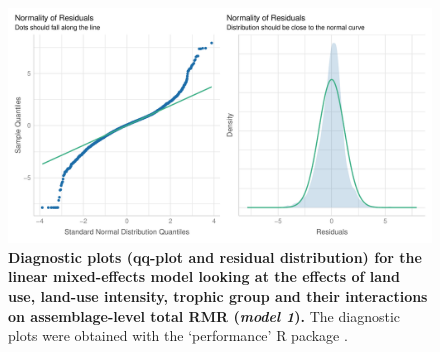 \begin{figure}[h!]
\centering
\includegraphics[scale=0.75]{Supporting/Chapter5/Figures/Diagnostics_tRMR}
\caption[Diagnostic plots for the linear mixed-effects model looking at the effects of land use, land-use intensity, trophic group and their interactions on assemblage-level total RMR]{\textbf{Diagnostic plots (qq-plot and residual distribution) for the linear mixed-effects model looking at the effects of land use, land-use intensity, trophic group and their interactions on assemblage-level total RMR (\textit{model 1}).} The diagnostic plots were obtained with the `performance' R package \citep{performance}.}
\label{SI5_figure3}
\end{figure}

